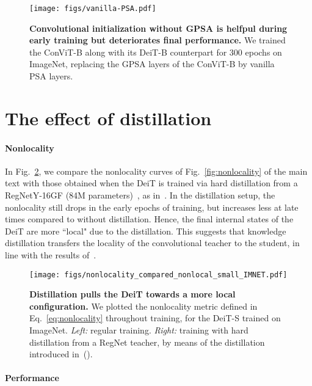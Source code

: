 \documentclass[a4paper,11pt,twocolumn]{article}
\newcommand{\citet}[1]{\textcite{#1}}
\newcommand{\citep}[1]{(\cite{#1})}
\begin{document}
\begin{figure}[htb]
    \centering
    \texttt{[image: figs/vanilla-PSA.pdf]}
    \caption{\textbf{Convolutional initialization without GPSA is helfpul during early training but deteriorates final performance.} We trained the ConViT-B along with its DeiT-B counterpart for 300 epochs on ImageNet, replacing the GPSA layers of the ConViT-B by vanilla PSA layers.}
    \label{fig:vanilla-psa}
\end{figure}

\section{The effect of distillation}
\label{app:distillation}

\paragraph{Nonlocality}

In Fig.~\ref{fig:nonlocality-distillation}, we compare the nonlocality curves of Fig.~\ref{fig:nonlocality} of the main text with those obtained when the DeiT is trained via hard distillation from a RegNetY-16GF (84M parameters)~\cite{radosavovic2020designing}, as in~\citet{touvron2020training}. In the distillation setup, the nonlocality still drops in the early epochs of training, but increases less at late times compared to without distillation. Hence, the final internal states of the DeiT are more ``local" due to the distillation. This suggests that knowledge distillation transfers the locality of the convolutional teacher to the student, in line with the results of~\cite{abnar2020transferring}.

\begin{figure}[htb]
    \centering
    \texttt{[image: figs/nonlocality\_compared\_nonlocal\_small\_IMNET.pdf]}
    \caption{\textbf{Distillation pulls the DeiT towards a more local configuration.} We plotted the nonlocality metric defined in Eq.~\ref{eq:nonlocality} throughout training, for the DeiT-S trained on ImageNet. \textit{Left:} regular training. \textit{Right:} training with hard distillation from a RegNet teacher, by means of the distillation introduced in~\citep{touvron2020training}.}
    \label{fig:nonlocality-distillation}
\end{figure}


\paragraph{Performance}
\end{document}

